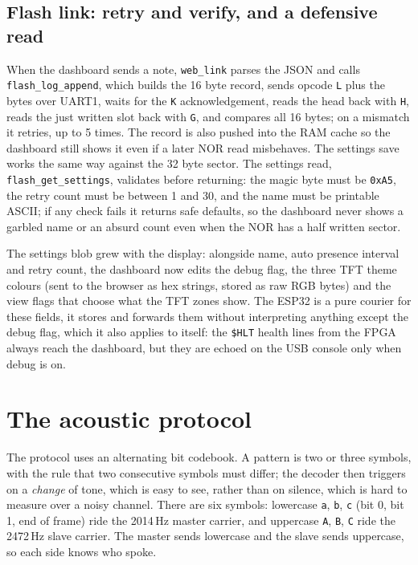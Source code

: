 \documentclass[a4paper,11pt]{article}
\begin{document}
\subsection{Flash link: retry and verify, and a defensive read}

When the dashboard sends a note, \texttt{web\_link} parses the JSON and calls
\texttt{flash\_log\_append}, which builds the 16 byte record, sends opcode
\texttt{L} plus the bytes over UART1, waits for the \texttt{K} acknowledgement,
reads the head back with \texttt{H}, reads the just written slot back with
\texttt{G}, and compares all 16 bytes; on a mismatch it retries, up to 5 times. The
record is also pushed into the RAM cache so the dashboard still shows it even if a
later NOR read misbehaves. The settings save works the same way against the 32 byte
sector. The settings read, \texttt{flash\_get\_settings}, validates before
returning: the magic byte must be \texttt{0xA5}, the retry count must be between 1
and 30, and the name must be printable ASCII; if any check fails it returns safe
defaults, so the dashboard never shows a garbled name or an absurd count even when
the NOR has a half written sector.

The settings blob grew with the display: alongside name, auto presence interval
and retry count, the dashboard now edits the debug flag, the three TFT theme
colours (sent to the browser as hex strings, stored as raw RGB bytes) and the
view flags that choose what the TFT zones show. The ESP32 is a pure courier for
these fields, it stores and forwards them without interpreting anything except
the debug flag, which it also applies to itself: the \texttt{\$HLT} health lines
from the FPGA always reach the dashboard, but they are echoed on the USB console
only when debug is on.

\section{The acoustic protocol}
\label{sec:protocol}

The protocol uses an alternating bit codebook. A pattern is two or three symbols,
with the rule that two consecutive symbols must differ; the decoder then triggers on
a \emph{change} of tone, which is easy to see, rather than on silence, which is hard
to measure over a noisy channel. There are six symbols: lowercase \texttt{a},
\texttt{b}, \texttt{c} (bit 0, bit 1, end of frame) ride the 2014\,Hz master carrier,
and uppercase \texttt{A}, \texttt{B}, \texttt{C} ride the 2472\,Hz slave carrier. The
master sends lowercase and the slave sends uppercase, so each side knows who spoke.
\end{document}
